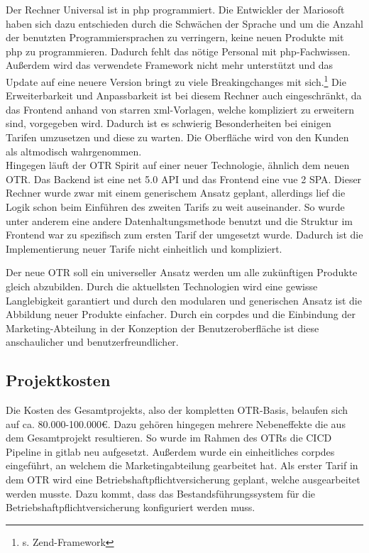 Der Rechner \glqq Universal\grqq{} ist in \gls{php} programmiert. Die Entwickler der Mariosoft haben sich dazu entschieden durch die Schwächen der Sprache und um die Anzahl der benutzten Programmiersprachen zu verringern, keine neuen Produkte mit \gls{php} zu programmieren. Dadurch fehlt das nötige Personal mit \gls{php}-Fachwissen. Außerdem wird das verwendete Framework nicht mehr unterstützt und das Update auf eine neuere Version bringt zu viele Breakingchanges mit sich.\footnote{s.\cite{Zend} Zend-Framework} Die Erweiterbarkeit und Anpassbarkeit ist bei diesem Rechner auch eingeschränkt, da das Frontend anhand von starren \gls{xml}-Vorlagen, welche kompliziert zu erweitern sind, vorgegeben wird. Dadurch ist es schwierig Besonderheiten bei einigen Tarifen umzusetzen und diese zu warten. Die Oberfläche wird von den Kunden als altmodisch wahrgenommen. \\
Hingegen läuft der \ac{OTR} \glqq Spirit\grqq{} auf einer neuer Technologie, ähnlich dem neuen \ac{OTR}. Das Backend ist eine \gls{net} 5.0 API und das Frontend eine \gls{vue} 2 \ac{SPA}. Dieser Rechner wurde zwar mit einem generischem Ansatz geplant, allerdings lief die Logik schon beim Einführen des zweiten Tarifs zu weit auseinander. So wurde unter anderem eine andere Datenhaltungsmethode benutzt und die Struktur im Frontend war zu spezifisch zum ersten Tarif der umgesetzt wurde. Dadurch ist die Implementierung neuer Tarife nicht einheitlich und kompliziert.

Der neue \ac{OTR} soll ein universeller Ansatz werden um alle zukünftigen Produkte gleich abzubilden. Durch die aktuellsten Technologien wird eine gewisse Langlebigkeit garantiert und durch den modularen und generischen Ansatz ist die Abbildung neuer Produkte einfacher. Durch ein \gls{corpdes} und die Einbindung der Marketing-Abteilung in der Konzeption der Benutzeroberfläche ist diese anschaulicher und benutzerfreundlicher.
\subsection{Projektkosten}
\label{projektkosten}
Die Kosten des Gesamtprojekts, also der kompletten \ac{OTR}-Basis, belaufen sich auf ca. 80.000-100.000€. Dazu gehören hingegen mehrere Nebeneffekte die aus dem Gesamtprojekt resultieren. So wurde im Rahmen des \ac{OTR}s die \ac{CICD} Pipeline in \gls{gitlab} neu aufgesetzt. Außerdem wurde ein einheitliches \gls{corpdes}	eingeführt, an welchem die Marketingabteilung gearbeitet hat. Als erster Tarif in dem \ac{OTR} wird eine Betriebshaftpflichtversicherung geplant, welche ausgearbeitet werden musste. Dazu kommt, dass das Bestandsführungssystem für die Betriebshaftpflichtversicherung konfiguriert werden muss.\\

